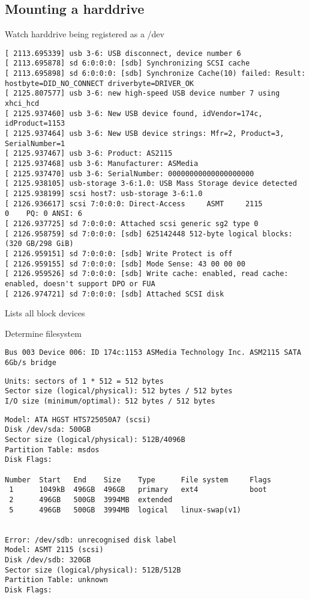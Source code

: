 \subsection{Mounting a harddrive}

Watch harddrive being registered as a /dev
\begin{lstlisting}
[ 2113.695339] usb 3-6: USB disconnect, device number 6
[ 2113.695878] sd 6:0:0:0: [sdb] Synchronizing SCSI cache
[ 2113.695898] sd 6:0:0:0: [sdb] Synchronize Cache(10) failed: Result: hostbyte=DID_NO_CONNECT driverbyte=DRIVER_OK
[ 2125.807577] usb 3-6: new high-speed USB device number 7 using xhci_hcd
[ 2125.937460] usb 3-6: New USB device found, idVendor=174c, idProduct=1153
[ 2125.937464] usb 3-6: New USB device strings: Mfr=2, Product=3, SerialNumber=1
[ 2125.937467] usb 3-6: Product: AS2115
[ 2125.937468] usb 3-6: Manufacturer: ASMedia
[ 2125.937470] usb 3-6: SerialNumber: 00000000000000000000
[ 2125.938105] usb-storage 3-6:1.0: USB Mass Storage device detected
[ 2125.938199] scsi host7: usb-storage 3-6:1.0
[ 2126.936617] scsi 7:0:0:0: Direct-Access     ASMT     2115             0    PQ: 0 ANSI: 6
[ 2126.937725] sd 7:0:0:0: Attached scsi generic sg2 type 0
[ 2126.958759] sd 7:0:0:0: [sdb] 625142448 512-byte logical blocks: (320 GB/298 GiB)
[ 2126.959151] sd 7:0:0:0: [sdb] Write Protect is off
[ 2126.959155] sd 7:0:0:0: [sdb] Mode Sense: 43 00 00 00
[ 2126.959526] sd 7:0:0:0: [sdb] Write cache: enabled, read cache: enabled, doesn't support DPO or FUA
[ 2126.974721] sd 7:0:0:0: [sdb] Attached SCSI disk
\end{lstlisting}


 Lists all block devices


Determine filesystem
\begin{lstlisting}
Bus 003 Device 006: ID 174c:1153 ASMedia Technology Inc. ASM2115 SATA 6Gb/s bridge
\end{lstlisting}

\begin{lstlisting}
Units: sectors of 1 * 512 = 512 bytes
Sector size (logical/physical): 512 bytes / 512 bytes
I/O size (minimum/optimal): 512 bytes / 512 bytes
\end{lstlisting}

\begin{lstlisting}
Model: ATA HGST HTS725050A7 (scsi)
Disk /dev/sda: 500GB
Sector size (logical/physical): 512B/4096B
Partition Table: msdos
Disk Flags: 

Number  Start   End    Size    Type      File system     Flags
 1      1049kB  496GB  496GB   primary   ext4            boot
 2      496GB   500GB  3994MB  extended
 5      496GB   500GB  3994MB  logical   linux-swap(v1)


Error: /dev/sdb: unrecognised disk label
Model: ASMT 2115 (scsi)                                                   
Disk /dev/sdb: 320GB
Sector size (logical/physical): 512B/512B
Partition Table: unknown
Disk Flags:
\end{lstlisting}


